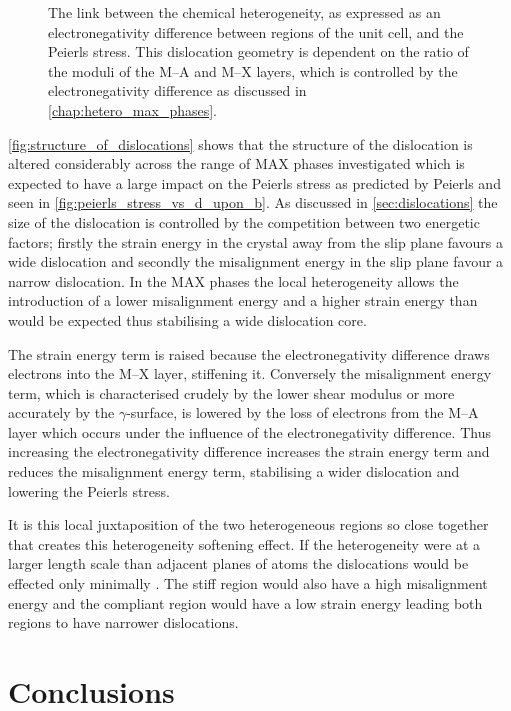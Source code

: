 \begin{figure}
\caption[The link between the structure of dislocations and local heterogeneity.]{The link between the chemical heterogeneity, as expressed as an electronegativity difference between regions of the unit cell, and the Peierls stress. This dislocation geometry is dependent on the ratio of the moduli of the M--A and M--X layers, which is controlled by the electronegativity difference as discussed in \autoref{chap:hetero_max_phases}. \label{fig:structure_of_dislocations}}
\end{figure}


\autoref{fig:structure_of_dislocations} shows that the structure of the dislocation is altered considerably across the range of MAX phases investigated which is expected to have a large impact on the Peierls stress as predicted by Peierls and seen in \autoref{fig:peierls_stress_vs_d_upon_b}. As discussed in \autoref{sec:dislocations} the size of the dislocation is controlled by the competition between two energetic factors; firstly the strain energy in the crystal away from the slip plane favours a wide dislocation and secondly the misalignment energy in the slip plane favour a narrow dislocation. In the MAX phases the local heterogeneity allows the introduction of a lower misalignment energy and a higher strain energy than would be expected thus stabilising a wide dislocation core.

The strain energy term is raised because the electronegativity difference draws electrons into the M--X layer, stiffening it. Conversely the misalignment energy term, which is characterised crudely by the lower shear modulus or more accurately by the $\gamma$-surface, is lowered by the loss of electrons from the M--A layer which occurs under the influence of the electronegativity difference. Thus increasing the electronegativity difference increases the strain energy term and reduces the misalignment energy term, stabilising a wider dislocation and lowering the Peierls stress.

It is this local juxtaposition of the two heterogeneous regions so close together that creates this heterogeneity softening effect. If the heterogeneity were at a larger length scale than adjacent planes of atoms the dislocations would be effected only minimally . The stiff region would also have a high misalignment energy and the compliant region would have a low strain energy leading both regions to have narrower dislocations.





\section{Conclusions}

